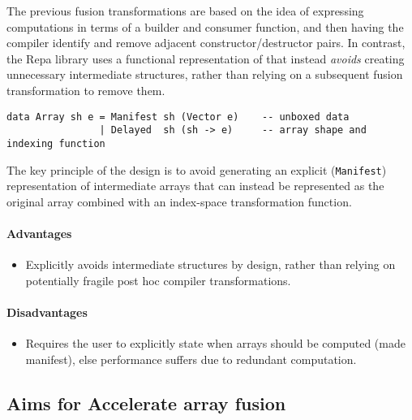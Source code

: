 The previous fusion transformations are based on the idea of expressing
computations in terms of a builder and consumer function, and then having the
compiler identify and remove adjacent constructor/destructor pairs. In contrast,
the Repa \cite{Keller:2010} library uses a functional representation of
 that instead \emph{avoids} creating unnecessary
intermediate structures, rather than relying on a subsequent fusion
transformation to remove them.

\begin{lstlisting}[style=Haskell,numbers=none,mathescape,caption={Repa-1 style array definition}]
data Array sh e = Manifest sh (Vector e)    -- unboxed data
                | Delayed  sh (sh -> e)     -- array shape and indexing function
\end{lstlisting}

The key principle of the design is to avoid generating an explicit
(\texttt{Manifest}) representation of intermediate arrays that can instead be
represented as the original array combined with an index-space transformation
function.


\paragraph{Advantages}
\begin{itemize}
    \item Explicitly avoids intermediate structures by design, rather than
        relying on potentially fragile post hoc compiler transformations.
\end{itemize}

\paragraph{Disadvantages}
\begin{itemize}
    \item Requires the user to explicitly state when arrays should be computed
        (made manifest), else performance suffers due to redundant computation.
\end{itemize}


\subsection{Aims for Accelerate array fusion}

